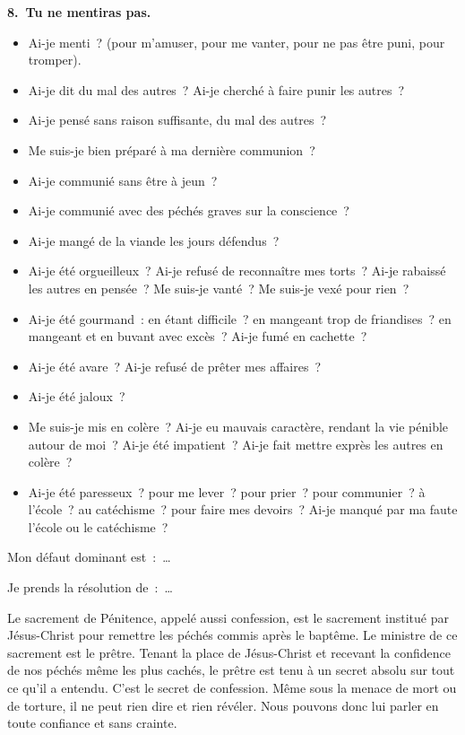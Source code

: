 \documentclass[%
a5paper%
,11pt%
,DIV=15%
,titlepage=on%
,headings=optiontoheadandtoc%
,headings=small%
,parskip=false%
,openany%
]{scrbook}
\newcommand{\commandement}[1]{\noindent\textbf{#1}}
\begin{document}
\commandement{8. Tu ne mentiras pas.}
\begin{itemize}
\item Ai-je menti ? (pour m’amuser, pour me vanter, pour ne pas être puni, pour tromper).
\item Ai-je dit du mal des autres ? Ai-je cherché à faire punir les autres ?
\item  Ai-je pensé sans raison suffisante, du mal des autres ?
\end{itemize}



\begin{itemize}
\item Me suis-je bien préparé à ma dernière
 communion ?
\item Ai-je communié sans être à jeun ?
\item Ai-je communié avec des péchés graves sur la conscience ?
\item Ai-je mangé de la viande les jours défendus ?
\end{itemize}



\begin{itemize}
\item Ai-je été orgueilleux ? Ai-je refusé de reconnaître mes torts ? Ai-je rabaissé les autres en pensée ? Me suis-je vanté ? Me suis-je vexé pour rien ?
\item Ai-je été gourmand : en étant difficile ? en mangeant trop de friandises ? en
mangeant et en buvant avec excès ? Ai-je fumé en cachette ?
\item Ai-je été avare ? Ai-je refusé de prêter mes affaires ?
\item Ai-je été jaloux ?
\item Me suis-je mis en colère ? Ai-je eu mauvais caractère, rendant la vie pénible
autour de moi ? Ai-je été impatient ? Ai-je fait mettre exprès les autres en colère ?
\item Ai-je été paresseux ? pour me lever ? pour prier ? pour communier ? à l’école ? au catéchisme ? pour faire mes devoirs ? Ai-je manqué par ma faute l’école ou le catéchisme ?
\end{itemize}

Mon défaut dominant est : …

Je prends la résolution de : …



Le sacrement de Pénitence, appelé aussi confession, est le sacrement institué par Jésus-Christ pour remettre les péchés commis après le baptême. Le ministre de ce sacrement est le prêtre. Tenant la place de Jésus-Christ et recevant la confidence de nos péchés même les plus cachés, le prêtre est tenu à un secret absolu sur tout ce qu’il a entendu. C’est le secret de confession. Même sous la menace de mort ou de torture, il ne peut rien dire et rien révéler. Nous pouvons donc lui parler en toute confiance et sans crainte.
\end{document}
